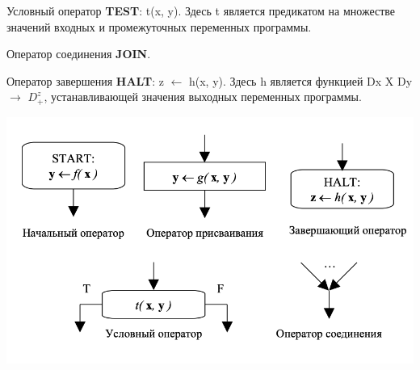 Условный оператор \textbf{TEST}: t(x, y). Здесь t является предикатом на множестве значений входных и промежуточных переменных программы.

Оператор соединения  \textbf{JOIN}.

Оператор завершения  \textbf{HALT}: z $\leftarrow$ h(x, y). Здесь h является функцией Dx X  Dy $\rightarrow$ $D^z_+$, устанавливающей значения выходных переменных программы.

\includegraphics[scale=0.2]{pics/halt.png}



